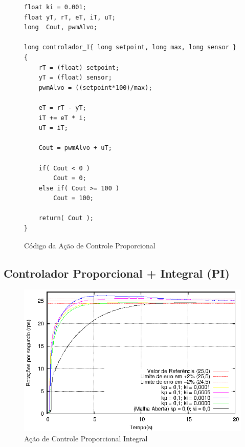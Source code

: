 \begin{figure}[!htb]
\centering
\begin{minipage}{0.8\linewidth}
\begin{lstlisting}
float ki = 0.001;
float yT, rT, eT, iT, uT;
long  Cout, pwmAlvo;

long controlador_I{ long setpoint, long max, long sensor }
{
    rT = (float) setpoint;
    yT = (float) sensor;
    pwmAlvo = ((setpoint*100)/max);

    eT = rT - yT;
    iT += eT * i; 
    uT = iT;

    Cout = pwmAlvo + uT;

    if( Cout < 0 )
        Cout = 0;
    else if( Cout >= 100 )
        Cout = 100;

    return( Cout );
}
\end{lstlisting}
\end{minipage}
\caption{Código da Ação de Controle Proporcional}
\label{fig:codigoControladorP}
\end{figure}



\subsection{ Controlador Proporcional + Integral (PI) }

\begin{figure}[!htb]
\center\includegraphics[scale=1]{./imagens/acaoPI.eps}
\caption{Ação de Controle Proporcional Integral}
\label{fig:acaoPI}
\end{figure}




